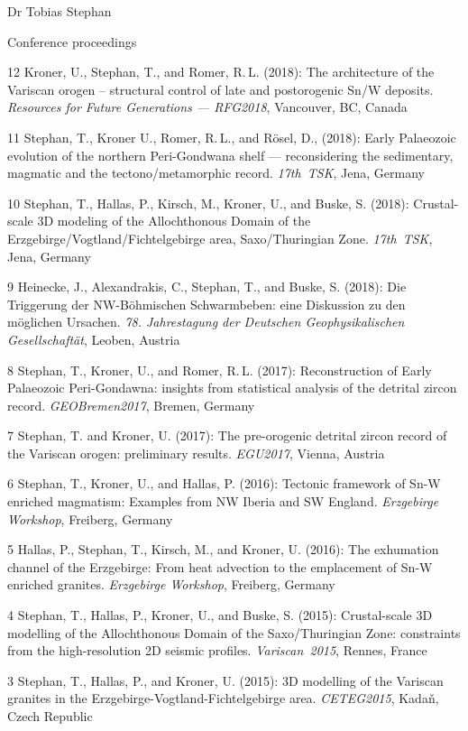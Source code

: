 \documentclass[10pt, paper=letter]{scrartcl} %
\begin{document}
\begin{cv}{Dr Tobias Stephan}
\begin{cvlist}{Conference proceedings}
    \item[12]Kroner, U., Stephan, T., and Romer, R.\,L. (2018): The architecture of the Variscan orogen – structural control of late and postorogenic Sn/W deposits.  \textit{Resources for Future Generations --- RFG2018}, Vancouver, BC, Canada
    \item[11] Stephan, T., Kroner U., Romer, R.\,L., and R\"osel, D., (2018): Early Palaeozoic evolution of the northern Peri-Gondwana shelf --- reconsidering the sedimentary, magmatic and the tectono\-/metamorphic record. \mbox{\textit{17th TSK}}, Jena, Germany
    \item[10] Stephan, T., Hallas, P., Kirsch, M., Kroner, U., and Buske, S. (2018): Crustal-scale 3D modeling of the Allochthonous Domain of the Erzgebirge\-/Vogtland\-/Fichtelgebirge area, Saxo\-/Thuringian Zone. \textit{17th~TSK}, Jena, Germany
    \item[9] Heinecke, J., Alexandrakis, C., Stephan, T., and Buske, S. (2018): Die Triggerung der NW-B\"ohmischen Schwarmbeben: eine Diskussion zu den m\"oglichen Ursachen. \textit{78. Jahrestagung der Deutschen Geophysikalischen Gesellschaft\"at}, Leoben, Austria
    \item[8] Stephan, T., Kroner, U., and Romer, R.\,L. (2017): Reconstruction of Early Palaeozoic Peri-Gondawna: insights from statistical analysis of the detrital zircon record. \textit{GEOBremen2017}, Bremen, Germany
    \item[7] Stephan, T. and Kroner, U. (2017): The pre-orogenic detrital zircon record of the Variscan orogen: preliminary results. \textit{EGU2017}, \mbox{Vienna}, Austria
    \item[6] Stephan, T., Kroner, U., and Hallas, P. (2016): Tectonic framework of \mbox{Sn-W} enriched magmatism: Examples from NW Iberia and SW England. \textit{Erzgebirge Workshop}, Freiberg, Germany
    \item[5] Hallas, P., Stephan, T., Kirsch, M., and Kroner, U.  (2016): The exhumation channel of the Erzgebirge: From heat advection to the emplacement of Sn-W enriched granites. \textit{Erzgebirge Workshop}, Freiberg, Germany
    \item[4] Stephan, T., Hallas, P., Kroner, U., and Buske, S. (2015): Crustal-scale 3D modelling of the Allochthonous Domain of the Saxo\-/Thuringian Zone: constraints from the high-resolution 2D seismic profiles. \mbox{\textit{Variscan 2015}}, Rennes, France 
    \item[3] Stephan, T., Hallas, P., and Kroner, U. (2015): 3D modelling of the Variscan granites in the Erzgebirge-Vogtland-Fichtelgebirge area. \mbox{\textit{CETEG2015}}, Kada\v{n}, Czech Republic

\end{cvlist}
\end{cv}
\end{document}
